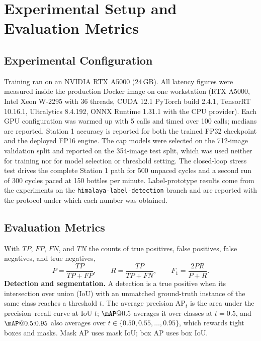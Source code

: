 \section{Experimental Setup and Evaluation Metrics}
\label{sec:setup}

\subsection{Experimental Configuration}
\label{sec:exp-config}
Training ran on an NVIDIA RTX A5000 (24\,GB). All latency figures were measured inside the production Docker image on one workstation (RTX A5000, Intel Xeon W-2295 with 36 threads, CUDA 12.1 PyTorch build 2.4.1, TensorRT 10.16.1, Ultralytics 8.4.192, ONNX Runtime 1.31.1 with the CPU provider). Each GPU configuration was warmed up with 5 calls and timed over 100 calls; medians are reported. Station 1 accuracy is reported for both the trained FP32 checkpoint and the deployed FP16 engine. The cap models were selected on the 712-image validation split and reported on the 354-image test split, which was used neither for training nor for model selection or threshold setting. The closed-loop stress test drives the complete Station 1 path for 500 unpaced cycles and a second run of 300 cycles paced at 150 bottles per minute. Label-prototype results come from the experiments on the \texttt{himalaya-label-detection} branch and are reported with the protocol under which each number was obtained.

\subsection{Evaluation Metrics}
\label{sec:metrics}
With $TP$, $FP$, $FN$, and $TN$ the counts of true positives, false positives, false negatives, and true negatives,
\begin{equation}
    P=\frac{TP}{TP+FP},\qquad R=\frac{TP}{TP+FN},\qquad F_1=\frac{2PR}{P+R}.
    \label{eq:prf}
\end{equation}
\noindent\textbf{Detection and segmentation.} A detection is a true positive when its intersection over union (IoU) with an unmatched ground-truth instance of the same class reaches a threshold $t$. The average precision $\mathrm{AP}_t$ is the area under the precision--recall curve at IoU $t$; $\mAP@0.5$ averages it over classes at $t=0.5$, and $\mAP@0.5{:}0.95$ also averages over $t\in\{0.50,0.55,\dots,0.95\}$, which rewards tight boxes and masks. Mask AP uses mask IoU; box AP uses box IoU.

